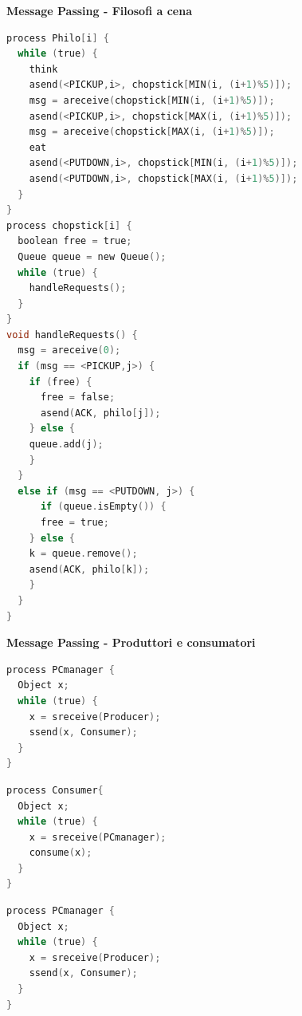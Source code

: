 \documentclass[a4paper,12pt]{article}
\begin{document}
\vspace{2em}
\textbf{Message Passing - Filosofi a cena}
\begin{lstlisting}[language=C]
process Philo[i] {
  while (true) {
    think
    asend(<PICKUP,i>, chopstick[MIN(i, (i+1)%5)]);
    msg = areceive(chopstick[MIN(i, (i+1)%5)]);
    asend(<PICKUP,i>, chopstick[MAX(i, (i+1)%5)]);
    msg = areceive(chopstick[MAX(i, (i+1)%5)]);
    eat
    asend(<PUTDOWN,i>, chopstick[MIN(i, (i+1)%5)]);
    asend(<PUTDOWN,i>, chopstick[MAX(i, (i+1)%5)]);
  }
}
process chopstick[i] {
  boolean free = true;
  Queue queue = new Queue();
  while (true) {
    handleRequests();
  }
}
void handleRequests() {
  msg = areceive(0);
  if (msg == <PICKUP,j>) {
    if (free) {
      free = false;
      asend(ACK, philo[j]);
    } else {
    queue.add(j);
    }
  } 
  else if (msg == <PUTDOWN, j>) {
      if (queue.isEmpty()) {
      free = true;
    } else {
    k = queue.remove();
    asend(ACK, philo[k]);
    }
  }
}
\end{lstlisting}
\vspace{2em} 
\textbf{Message Passing - Produttori e consumatori}
\begin{lstlisting}[language=C]
process PCmanager {
  Object x;
  while (true) {
    x = sreceive(Producer);
    ssend(x, Consumer);
  }
}
\end{lstlisting}
\begin{minipage}{0.48\textwidth}
\begin{lstlisting}[language=C]
process Consumer{
  Object x;
  while (true) {
    x = sreceive(PCmanager);
    consume(x);
  }
}
\end{lstlisting}
\end{minipage}
\hfill
\begin{minipage}{0.48\textwidth}
\begin{lstlisting}[language=C]
process PCmanager {
  Object x;
  while (true) {
    x = sreceive(Producer);
    ssend(x, Consumer);
  }
}
\end{lstlisting}
\end{minipage}
\vspace{2em} \\
\end{document}
